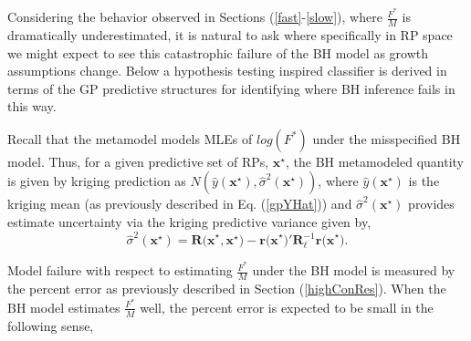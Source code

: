 %
Considering the behavior observed in Sections (\ref{fast}-\ref{slow}), where
$\frac{F^*}{M}$ is dramatically underestimated, it is natural to ask
where specifically in RP space we might expect to see this catastrophic failure 
of the BH model as growth assumptions change.
%
Below a hypothesis testing inspired classifier is derived in terms of the GP predictive structures 
for identifying where BH inference fails in this way. 


%
Recall that the metamodel models MLEs of $log(F^*)$ under the misspecified BH model.
Thus, for a given predictive set of RPs, $\textbf{x}^\star$, the BH metamodeled
quantity is given by kriging prediction as $N(\hat y(\textbf{x}^\star), \hat \sigma^2(\textbf{x}^\star))$,
where $\hat y(\textbf{x}^\star)$ is the kriging mean (as previously described in
Eq. (\ref{gpYHat})) and $\hat \sigma^2(\textbf{x}^\star)$ provides estimate
uncertainty via the kriging predictive variance given by,
\begin{equation} %
       \hat \sigma^2(\textbf{x}^\star) = \textbf{R(x}^\star, \textbf{x}^\star\textbf{)} - \textbf{r(x}^\star\textbf{)}'\bm{R}^{-1}_{\bm{\ell}}\textbf{r(x}^\star\textbf{)}.
\end{equation}

%
Model failure with respect to estimating $\frac{F^*}{M}$ under the BH
model is measured by the percent error as previously described in Section (\ref{highConRes}).
When the BH model estimates $\frac{F^*}{M}$ well, the percent error is
expected to be small in the following sense,


